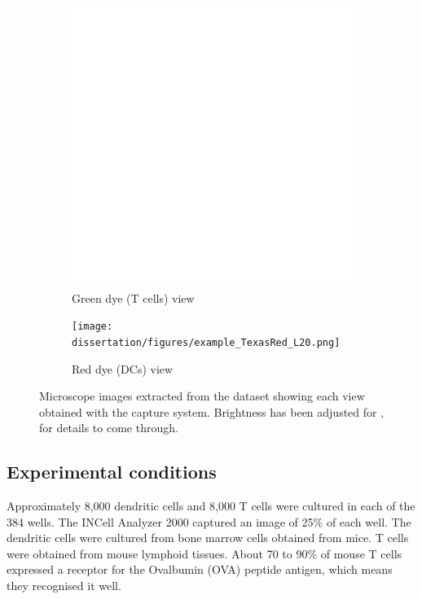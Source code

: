 \begin{figure}[h]
\begin{subfigure}[h!]{0.3\textwidth}
        \includegraphics[width=\textwidth]{dissertation/figures/example_FITC_L20.png}
        \caption{Green dye (T cells) view}
        \label{fig:fov_fitc}
    \end{subfigure}
    \begin{subfigure}[h!]{0.3\textwidth}
        \texttt{[image: dissertation/figures/example\_TexasRed\_L20.png]}
        \caption{Red dye (DCs) view}
        \label{fig:fov_tr}
    \end{subfigure}
    \caption{Microscope images extracted from the dataset showing each view obtained with the capture system. Brightness has been adjusted for ,  for details to come through.}
    \label{fig:fov}
\end{figure}

\subsection{Experimental conditions}

Approximately 8,000 dendritic cells and 8,000 T cells were cultured in each of the 384 wells. The INCell Analyzer 2000 captured an image of 25\% of each well. The dendritic cells were cultured from bone marrow cells obtained from mice. T cells were obtained from mouse lymphoid tissues. About 70 to 90\% of mouse T cells expressed a receptor for the Ovalbumin (OVA) peptide antigen, which means they recognised it well. 

